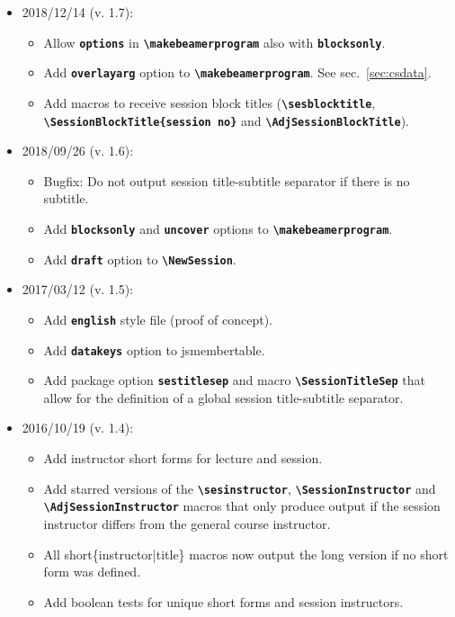 \documentclass[english]{article}
\newcommand*\jmacro[1]{\textbf{\texttt{#1}}}
\newcommand*\jcsmacro[1]{\jmacro{\textbackslash{#1}}}
\newcommand*\joption[1]{\textbf{\texttt{#1}}}
\newcommand*\jparam[1]{\angus #1\angud}
\newcommand*\jsmt{\textsf{jsmembertable}}
\begin{document}
\begin{itemize}
\begin{itemize}
	\end{itemize}
\item 2018/12/14 (v. 1.7):
	\begin{itemize}
		\item Allow \joption{options} in \jcsmacro{makebeamerprogram} also with \joption{blocksonly}.
		\item Add \joption{overlayarg} option to \jcsmacro{makebeamerprogram}. See sec.~\ref{sec:csdata}.
		\item Add macros to receive session block titles (\jcsmacro{sesblocktitle},\\
		      \jcsmacro{SessionBlockTitle\{\jparam{session no}\}} and \jcsmacro{AdjSessionBlockTitle}).
	\end{itemize}
\item 2018/09/26 (v. 1.6):
	\begin{itemize}
	    \item Bugfix: Do not output session title-subtitle separator if there is no	subtitle.
	    \item Add \joption{blocksonly} and \joption{uncover} options to \jcsmacro{makebeamerprogram}.
	    \item Add \joption{draft} option to \jcsmacro{NewSession}.
    \end{itemize}
\item 2017/03/12 (v. 1.5):
	\begin{itemize}
		\item Add \joption{english} style file (proof of concept).
		\item Add \joption{datakeys} option to \jsmt.
		\item Add package option \joption{sestitlesep} and macro \jcsmacro{SessionTitleSep} that
		allow for the definition of a global session title-subtitle	separator.
	\end{itemize}
\item 2016/10/19 (v. 1.4):
	\begin{itemize}
		\item Add instructor short forms for lecture and session.
		\item Add starred versions of the \jcsmacro{sesinstructor}, \jcsmacro{SessionInstructor} and \jcsmacro{AdjSessionInstructor} macros that only produce output if the session instructor differs from the general course instructor.
		\item All short\{instructor|title\} macros now output the long version if no short form was defined.
		\item Add boolean tests for unique short forms and session instructors.

\end{itemize}
\end{itemize}
\end{document}
